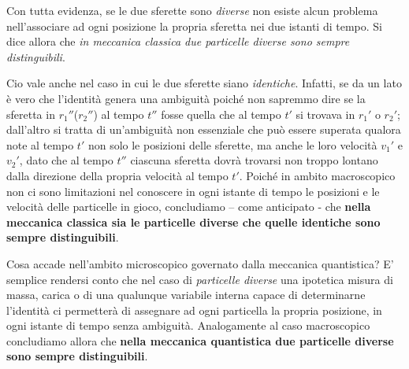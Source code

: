 Con tutta evidenza, se le due sferette sono \emph{diverse} non esiste alcun problema nell’associare ad ogni posizione la propria sferetta nei due istanti di tempo. Si dice allora che \emph{in meccanica classica due particelle diverse sono sempre distinguibili}.

Cio vale anche nel caso in cui le due sferette siano \emph{identiche}. Infatti, se da un lato è vero che l’identità genera una ambiguità poiché non sapremmo dire se la sferetta in $r_{1}''$($r_{2}''$) al tempo $t''$ fosse quella che al tempo $t'$ si trovava in $r_{1}'$ o $r_{2}'$; dall’altro si tratta di un’ambiguità non essenziale che può essere superata qualora note al tempo $t'$ non solo le posizioni delle sferette, ma anche le loro velocità $v_{1}'$ e $v_{2}'$, dato che al tempo $t''$ ciascuna sferetta dovrà trovarsi non troppo lontano dalla direzione della propria velocità al tempo $t'$. Poiché in ambito macroscopico non ci sono limitazioni nel conoscere in ogni istante di tempo le posizioni e le velocità delle particelle in gioco, concludiamo – come anticipato - che \textbf{nella meccanica classica sia le particelle diverse che quelle identiche sono sempre distinguibili}.
\bigskip

Cosa accade nell’ambito microscopico governato dalla meccanica quantistica? E’ semplice rendersi conto che nel caso di \emph{particelle diverse} una ipotetica misura di massa, carica o di una qualunque variabile interna capace di determinarne l’identità ci permetterà di assegnare ad ogni particella la propria posizione, in ogni istante di tempo senza ambiguità. Analogamente al caso macroscopico concludiamo allora che \textbf{nella meccanica quantistica due particelle diverse sono sempre distinguibili}.

